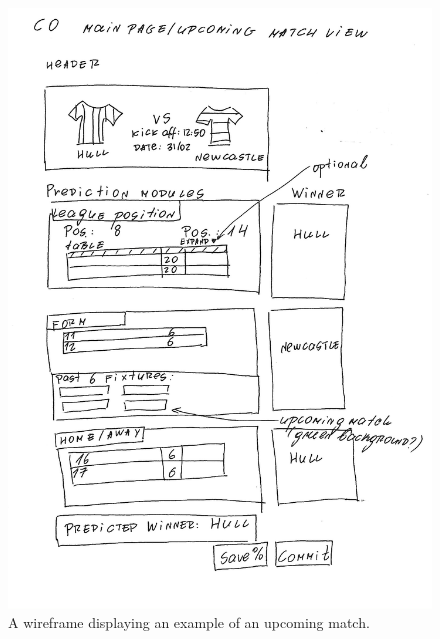 \begin{figure}[H]
	\begin{center}
		\includegraphics[width=.90\textwidth]{design/images/C0.jpg}
		\caption{A wireframe displaying an example of an upcoming match.} \label{fig:using:wireframe_c0}
	\end{center}
\end{figure}

